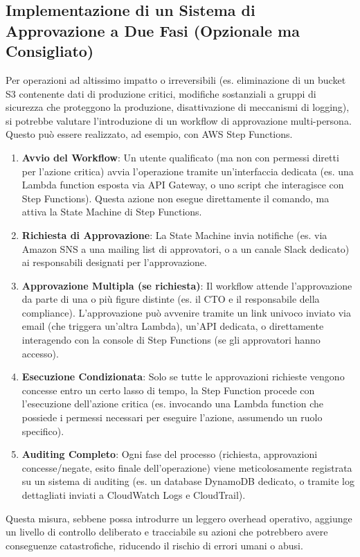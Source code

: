 \subsection{Implementazione di un Sistema di Approvazione a Due Fasi (Opzionale ma Consigliato)}
Per operazioni ad altissimo impatto o irreversibili (es. eliminazione di un bucket S3 contenente dati di produzione critici, modifiche sostanziali a gruppi di sicurezza che proteggono la produzione, disattivazione di meccanismi di logging), si potrebbe valutare l'introduzione di un workflow di approvazione multi-persona. Questo può essere realizzato, ad esempio, con AWS Step Functions.
\begin{enumerate}
    \item \textbf{Avvio del Workflow}: Un utente qualificato (ma non con permessi diretti per l'azione critica) avvia l'operazione tramite un'interfaccia dedicata (es. una Lambda function esposta via API Gateway, o uno script che interagisce con Step Functions). Questa azione non esegue direttamente il comando, ma attiva la State Machine di Step Functions.
    \item \textbf{Richiesta di Approvazione}: La State Machine invia notifiche (es. via Amazon SNS a una mailing list di approvatori, o a un canale Slack dedicato) ai responsabili designati per l'approvazione.
    \item \textbf{Approvazione Multipla (se richiesta)}: Il workflow attende l'approvazione da parte di una o più figure distinte (es. il CTO e il responsabile della compliance). L'approvazione può avvenire tramite un link univoco inviato via email (che triggera un'altra Lambda), un'API dedicata, o direttamente interagendo con la console di Step Functions (se gli approvatori hanno accesso).
    \item \textbf{Esecuzione Condizionata}: Solo se tutte le approvazioni richieste vengono concesse entro un certo lasso di tempo, la Step Function procede con l'esecuzione dell'azione critica (es. invocando una Lambda function che possiede i permessi necessari per eseguire l'azione, assumendo un ruolo specifico).
    \item \textbf{Auditing Completo}: Ogni fase del processo (richiesta, approvazioni concesse/negate, esito finale dell'operazione) viene meticolosamente registrata su un sistema di auditing (es. un database DynamoDB dedicato, o tramite log dettagliati inviati a CloudWatch Logs e CloudTrail).
\end{enumerate}
Questa misura, sebbene possa introdurre un leggero overhead operativo, aggiunge un livello di controllo deliberato e tracciabile su azioni che potrebbero avere conseguenze catastrofiche, riducendo il rischio di errori umani o abusi.

